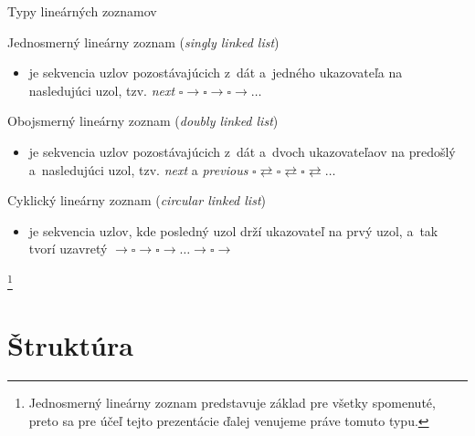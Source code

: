 \documentclass[slovak, 11pt]{beamer}
\newcommand\blfootnote[1]{\begingroup\renewcommand\thefootnote{}\footnote{#1}\addtocounter{footnote}{-1}\endgroup}
\begin{document}
\begin{frame}{Typy lineárných zoznamov}
    \begin{block}{Jednosmerný lineárny zoznam (\emph{singly linked list})}
        \begin{itemize}
            \item je sekvencia uzlov pozostávajúcich z~dát a~jedného ukazovateľa na nasledujúci uzol, tzv. \emph{next} \hfill $\square \rightarrow \square \rightarrow \square \rightarrow \dots$
        \end{itemize}
    \end{block}
    \begin{block}{Obojsmerný lineárny zoznam (\emph{doubly linked list})}
        \begin{itemize}
            \item je sekvencia uzlov pozostávajúcich z~dát a~dvoch ukazovateľaov na predošlý a~nasledujúci uzol, tzv. \emph{next} a \emph{previous} \hfill $\square \rightleftarrows \square \rightleftarrows \square \rightleftarrows \dots$
        \end{itemize}
    \end{block}
    \begin{block}{Cyklický lineárny zoznam (\emph{circular linked list})}
        \begin{itemize}
            \item je sekvencia uzlov, kde posledný uzol drží ukazovateľ na prvý uzol, a~tak tvorí uzavretý  \hfill $\rightarrow \square \rightarrow \square \rightarrow \dots \rightarrow \square \rightarrow$
        \end{itemize}
    \end{block}
    \blfootnote{Jednosmerný lineárny zoznam predstavuje základ pre všetky spomenuté, preto sa pre účeľ tejto prezentácie ďalej venujeme práve tomuto typu.}
\end{frame}


\section{Štruktúra}
\end{document}
